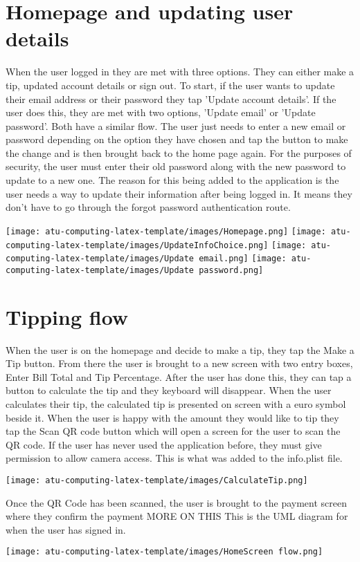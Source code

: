 \section{Homepage and updating user details}
When the user logged in they are met with three options. They can either make a tip, updated account details or sign out. To start, if the user wants to update their email address or their password they tap 'Update account details'. If the user does this, they are met with two options, 'Update email' or 'Update password'. Both have a similar flow. The user just needs to enter a new email or password depending on the option they have chosen and tap the button to make the change and is then brought back to the home page again. For the purposes of security, the user must enter their old password along with the new password to update to a new one. The reason for this being added to the application is the user needs a way to update their information after being logged in. It means they don't have to go through the forgot password authentication route.

\begin{center}
\texttt{[image: atu-computing-latex-template/images/Homepage.png]}
\texttt{[image: atu-computing-latex-template/images/UpdateInfoChoice.png]}
\texttt{[image: atu-computing-latex-template/images/Update email.png]}
\texttt{[image: atu-computing-latex-template/images/Update password.png]}
\end{center}
\section{Tipping  flow}
When the user is on the homepage and decide to make a tip, they tap the Make a Tip button. From there the user is brought to a new screen with two entry boxes, Enter Bill Total and Tip Percentage. After the user has done this, they can tap a button to calculate the tip and they keyboard will disappear. When the user calculates their tip, the calculated tip is presented on screen with a euro symbol beside it. When the user is happy with the amount they would like to tip they tap the Scan QR code button which will open a screen for the user to scan the QR code. If the user has never used the application before, they must give permission to allow camera access. This is what was added to the info.plist file.
\begin{center}
    \texttt{[image: atu-computing-latex-template/images/CalculateTip.png]}
\end{center}
Once the QR Code has been scanned, the user is brought to the payment screen where they confirm the payment MORE ON THIS
This is the UML diagram for when the user has signed in.
\begin{center}
    \texttt{[image: atu-computing-latex-template/images/HomeScreen flow.png]}
\end{center}
